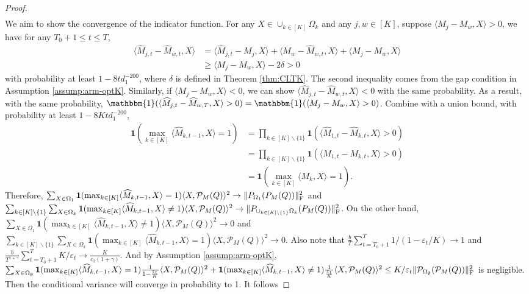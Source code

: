 \documentclass[12pt]{article}
\newcommand\fro[1]{\| #1 \|_{\rm{F}}}
\newcommand{\inp}[2]{\langle #1,#2\rangle}
\def\calP{{\mathcal P}}
\def\indicator{\mathbf{1}}
\theoremstyle{plain}
\begin{document}
\begin{proof}
\begin{align*}
    \end{align*}
    We aim to show the convergence of the indicator function. For any $X\in \cup_{k\in [K]} \Omega_k$ and any $j,w\in [K]$, suppose $\inp{M_j-M_w}{X}>0$, we have for any $T_0+1\leq t\leq T$,
    \begin{align*}
       \inp{\widehat{M}_{j,t}-\widehat{M}_{w,t}}{X}&=\inp{\widehat{M}_{j,t} - M_j}{X} + \inp{M_w-\widehat{M}_{w,t}}{X} + \inp{M_j-M_w}{X} \\
       &\geq \inp{M_j-M_w}{X} - 2\delta >0
    \end{align*}
    with probability at least $1-8td_1^{-200}$, where $\delta$ is defined in Theorem \ref{thm:CLTK}. The second inequality comes from the gap condition in Assumption \ref{assump:arm-optK}. Similarly, if $\inp{M_j-M_w}{X}<0$, we can show $ \inp{\widehat{M}_{j,t}-\widehat{M}_{w,t}}{X}<0$ with the same probability. As a result, with the same probability, $\mathbbm{1}(\inp{\widehat{M}_{j,t}-\widehat{M}_{w,T}}{X}>0)=\mathbbm{1}(\inp{M_j-M_w}{X}>0)$. Combine with a union bound, with probability at least $1-8Ktd_1^{-200}$,
    \begin{align*}
        \indicator\left(\max_{k\in [K]}\inp{\widehat{M}_{k,t-1}}{X}=1\right)&=\prod_{k\in [K]\backslash \{1\}} \indicator\left(\inp{\widehat{M}_{1,t}-\widehat{M}_{k,t}}{X}>0\right) \\
        &= \prod_{k\in [K]\backslash \{1\}} \indicator\left(\inp{{M}_{1,t}-{M}_{k,t}}{X}>0\right) \\
        &= \indicator\left(\max_{k\in [K]}\inp{{M}_{k}}{X}=1\right).
    \end{align*}
    Therefore, $\sum_{X\in \Omega_1} \indicator(\max_{k\in [K]}\inp{\widehat{M}_{k,t-1}}{X}=1)\inp{X}{\mathcal{P}_M(Q)}^2\rightarrow \fro{P_{\Omega_1}(P_{M}(Q))}^2$ and \\ $\sum_{k \in [K]\backslash \{1\}}\sum_{X\in \Omega_k} \indicator(\max_{k\in [K]}\inp{\widehat{M}_{k,t-1}}{X}\neq 1)\inp{X}{\mathcal{P}_M(Q)}^2\rightarrow \fro{P_{\cup_{k\in [K]\backslash \{1\}} \Omega_k}(P_{M}(Q))}^2$. On the other hand, $\sum_{X\in \Omega_1} \indicator(\max_{k\in [K]}\inp{\widehat{M}_{k,t-1}}{X}\neq 1)\inp{X}{\mathcal{P}_M(Q)}^2\rightarrow 0$ and \\ $\sum_{k \in [K]\backslash \{1\}}\sum_{X\in \Omega_k} \indicator(\max_{k\in [K]}\inp{\widehat{M}_{k,t-1}}{X}= 1)\inp{X}{\mathcal{P}_M(Q)}^2\rightarrow 0$.
    Also note that $\frac{b}{T}\sum_{t=T_0+1}^{T} 1/(1-\varepsilon_t/K)\rightarrow 1$ and $\frac{b}{T^{1+\gamma}}\sum_{t=T_0+1}^{T} K/\varepsilon_t\rightarrow \frac{K}{c_2(1+\gamma)}$. And by Assumption \ref{assump:arm-optK}, $\sum_{X\in \Omega_\emptyset} \indicator(\max_{k\in [K]}\inp{\widehat{M}_{k,t-1}}{X}=1)\frac{1}{1-\frac{\varepsilon_t}{K}}\inp{X}{\mathcal{P}_M(Q)}^2  +  \indicator(\max_{k\in [K]}\inp{\widehat{M}_{k,t-1}}{X}\neq 1)\frac{1}{\frac{\varepsilon_t}{K}}\inp{X}{\mathcal{P}_M(Q)}^2\leq K/\varepsilon_t \fro{\calP_{\Omega_{\emptyset}}(\calP_{M}(Q))}^2$ is negligible. Then the conditional variance will converge in probability to 1. It follows

\end{proof}
\end{document}
